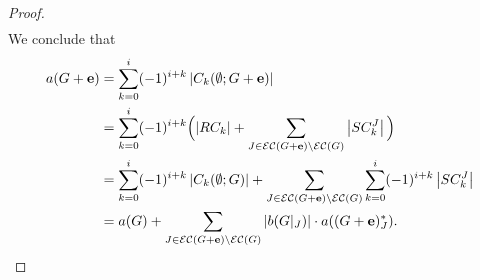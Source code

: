 \documentclass[10pt]{amsart}
\theoremstyle{plain}
\numberwithin{equation}{section}
\theoremstyle{definition}
\newcommand{\edge}{\mathbf{e}}
\newcommand{\EC}{\mathcal{E}\mathcal{C}}
\begin{document}
\begin{proof}
\begin{align*}
    \end{align*}
    We conclude that
    \begin{align*}
      a(G+\edge) & = \sum_{k = 0}^{i}(-1)^{i+k}\left\vert C_{k}(\emptyset;G+\edge)\right\vert
     \\
     & = \sum_{k = 0}^{i}(-1)^{i+k} \Bigl( \left\vert RC_{k}\right\vert + \sum_{J \in \EC(G+\edge) \setminus \EC(G)}\left\vert SC^J_k\right\vert \Bigl)
     \\
       & = \sum_{k = 0}^{i}(-1)^{i+k}\left\vert C_{k}(\emptyset;G)\right\vert + \sum_{J \in \EC(G+\edge) \setminus \EC(G)}\sum_{k=0}^{i}(-1)^{i+k}\left\vert SC^J_k\right\vert
     \\
     & = a(G) + \sum_{J \in \EC(G+\edge) \setminus \EC(G)} \left\vert b(G\vert_J) \right\vert \cdot a((G + \edge)^\ast_J).
    \end{align*}
\end{proof}
\end{document}
